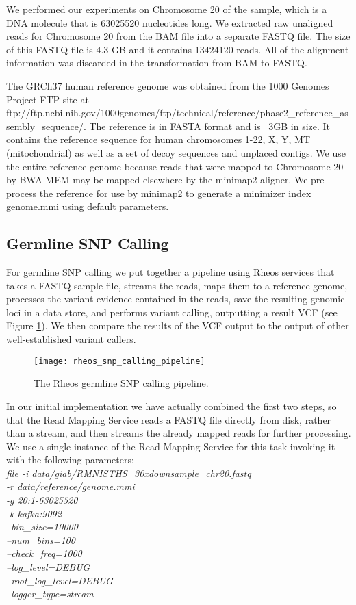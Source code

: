We performed our experiments on Chromosome 20 of the sample, which is a DNA molecule that is 63025520 nucleotides long. We extracted raw unaligned reads for Chromosome 20 from the BAM file into a separate FASTQ file. The size of this FASTQ file is 4.3 GB and it contains 13424120 reads. All of the alignment information was discarded in the transformation from BAM to FASTQ.

The GRCh37 human reference genome was obtained from the 1000 Genomes Project FTP site at ftp://ftp.ncbi.nih.gov/1000genomes/ftp/technical/reference/phase2\_reference\_assembly\_sequence/. The reference is in FASTA format and is ~3GB in size. It contains the reference sequence for human chromosomes 1-22, X, Y, MT (mitochondrial) as well as a set of decoy sequences and unplaced contigs. We use the entire reference genome because reads that were mapped to Chromosome 20 by BWA-MEM may be mapped elsewhere by the minimap2 aligner. We pre-process the reference for use by minimap2 to generate a minimizer index genome.mmi using default parameters.

\subsection{Germline SNP Calling}

For germline SNP calling we put together a pipeline using Rheos services that takes a FASTQ sample file, streams the reads, maps them to a reference genome, processes the variant evidence contained in the reads, save the resulting genomic loci in a data store, and performs variant calling, outputting a result VCF (see Figure \ref{fig:rheos_snp_calling_pipeline}). We then compare the results of the VCF output to the output of other well-established variant callers.

\begin{figure}[h!]
    \texttt{[image: rheos\_snp\_calling\_pipeline]}
    \centering
    \caption {The Rheos germline SNP calling pipeline.}
    \label{fig:rheos_snp_calling_pipeline}
\end{figure}

In our initial implementation we have actually combined the first two steps, so that the Read Mapping Service reads a FASTQ file directly from disk, rather than a stream, and then streams the already mapped reads for further processing. We use a single instance of the Read Mapping Service for this task invoking it with the following parameters:
\\
\emph{file -i data/giab/RMNISTHS\_30xdownsample\_chr20.fastq \\
-r data/reference/genome.mmi \\
-g 20:1-63025520 \\
-k kafka:9092 \\
--bin\_size=10000 \\
--num\_bins=100 \\
--check\_freq=1000 \\
--log\_level=DEBUG \\
--root\_log\_level=DEBUG \\
--logger\_type=stream\\}


